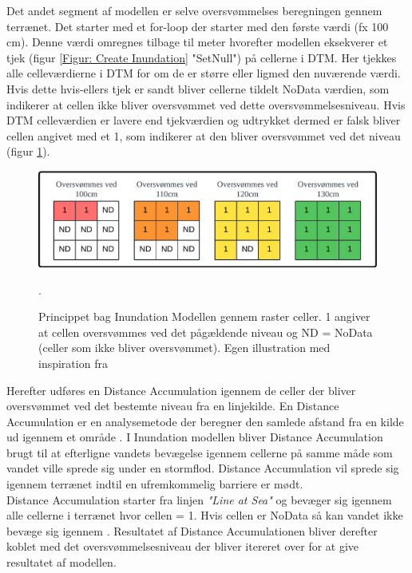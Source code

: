 Det andet segment af modellen er selve oversvømmelses beregningen gennem terrænet. Det starter med et for-loop der starter med den første værdi (fx 100 cm). Denne værdi omregnes tilbage til meter hvorefter modellen eksekverer et tjek (figur \ref{Figur: Create Inundation} "SetNull") på cellerne i DTM. Her tjekkes alle celleværdierne i DTM for om de er større eller ligmed den nuværende værdi. Hvis dette hvis-ellers tjek er sandt bliver cellerne tildelt NoData værdien, som indikerer at cellen ikke bliver oversvømmet ved dette oversvømmelsesniveau. Hvis DTM celleværdien er lavere end tjekværdien og udtrykket dermed er falsk bliver cellen angivet med et 1, som indikerer at den bliver oversvømmet ved det niveau (figur \ref{Figur: Celler Inundated}).       

\begin{figure}[H]
    \centering
    \includegraphics[width=0.7\linewidth]{images/teori/celler_inundated.png}
    \caption{Princippet bag Inundation Modellen gennem raster celler. 1 angiver at cellen oversvømmes ved det pågældende niveau og ND = NoData (celler som ikke bliver oversvømmet).  Egen illustration med inspiration fra \cite{balstrom_kirby_inundation}}.
    \label{Figur: Celler Inundated}
\end{figure}

Herefter udføres en Distance Accumulation igennem de celler der bliver oversvømmet ved det bestemte niveau fra en linjekilde. En Distance Accumulation er en analysemetode der beregner den samlede afstand fra en kilde ud igennem et område \citep{esri_how_nodate}. I Inundation modellen bliver Distance Accumulation brugt til at efterligne vandets bevægelse igennem cellerne på samme måde som vandet ville sprede sig under en stormflod. Distance Accumulation vil sprede sig igennem terrænet indtil en ufremkommelig barriere er mødt.\\ 
Distance Accumulation starter fra linjen \textit{"Line at Sea"} og bevæger sig igennem alle cellerne i terrænet hvor cellen = 1. Hvis cellen er NoData så kan vandet ikke bevæge sig igennem \citep{balstrom_kirby_inundation}. Resultatet af Distance Accumulationen bliver derefter koblet med det oversvømmelsesniveau der bliver itereret over for at give resultatet af modellen.  
